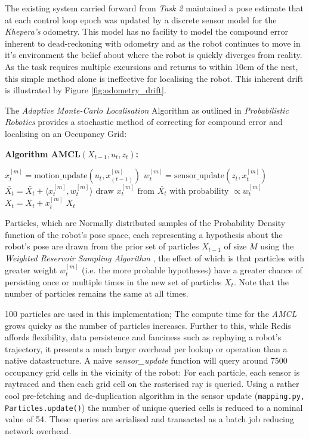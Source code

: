 \documentclass[11pt, a4paper]{article}
\begin{document}
The existing system carried forward from \textit{Task 2} \cite{task2_report} maintained a pose estimate
that at each control loop epoch was updated by a discrete sensor model for the \textit{Khepera's} 
odometry. This model has no facility to model the compound error inherent to dead-reckoning with
odometry and as the robot continues to move in it's environment the belief about where the robot is quickly 
diverges from reality. As the task requires multiple excursions and returns to within 10cm of the nest,
this simple method alone is ineffective for localising the robot. This inherent drift is illustrated by
Figure \ref{fig:odometry_drift}.

The \textit{Adaptive Monte-Carlo Localisation} Algorithm as outlined in 
\textit{Probabilistic Robotics} \cite{probabilisticrobot} provides a stochastic method of correcting
for compound error and localising on an Occupancy Grid:

\textbf{\large Algorithm AMCL${(X_{t-1}, u_t, z_t)}$:}
\begin{algorithmic}
  \STATE $x_{t}^{[m]}= \textrm{motion\_update}(u_{t},x_{(t-1)}^{[m]})$
  \STATE $w_{t}^{[m]}= \textrm{sensor\_update}(z_{t},x_{t}^{[m]})$
  \STATE $\bar{X_{t}}=\bar{X_{t}}+\langle x_{t}^{[m]},w_{t}^{[m]}\rangle $
  \ENDFOR
  \STATE $\textrm{draw } x_{t}^{[m]} \textrm{ from } \bar{X_{t}} \textrm{ with probability } \propto w_{t}^{[m]}$
  \STATE $X_{t}=X_{t}+x_{t}^{[m]}$
  \ENDFOR
  \RETURN $X_{t}$
\end{algorithmic}

Particles, which are Normally distributed samples of the Probability Density function of the robot's 
pose space, each representing a hypothesis about the robot's pose are drawn from the prior set 
of particles ${X_{t-1}}$ of size $M$ using the \textit{Weighted Reservoir 
Sampling Algorithm} \cite{reservoirsample}, the effect of which is that particles with greater 
weight ${w_t^{[m]}}$ (i.e. the more probable hypotheses) have a greater chance of persisting once 
or multiple times in the new set of particles ${X_t}$. Note that the number of particles remains 
the same at all times.

100 particles are used in this implementation; The compute time for the \textit{AMCL} grows quicky
as the number of particles increases. Further to this, while Redis affords flexibility, data persistence
and fanciness such as replaying a robot's trajectory, it presents a much larger overhead per lookup
or operation than a native datastructure. A naive \textit{sensor\_update} function will query
around 7500 occupancy grid cells in the vicinity of the robot: For each particle, each sensor is 
raytraced and then each grid cell on the rasterised ray is queried. Using a rather cool pre-fetching
and de-duplication algorithm in the sensor update (\texttt{mapping.py, Particles.update()}) the number
of unique queried cells is reduced to a nominal value of 54. These queries are serialised and
transacted as a batch job reducing network overhead.
\end{document}
